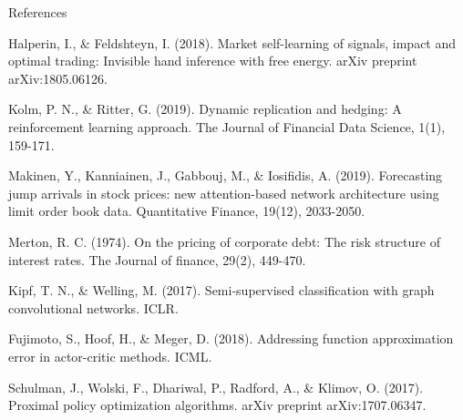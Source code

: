 \documentclass{beamer}
\begin{document}
\begin{frame}{References}
\footnotesize
\begin{thebibliography}{99}
 Halperin, I., \& Feldshteyn, I. (2018). Market self-learning of signals, impact and optimal trading: Invisible hand inference with free energy. arXiv preprint arXiv:1805.06126.

 Kolm, P. N., \& Ritter, G. (2019). Dynamic replication and hedging: A reinforcement learning approach. The Journal of Financial Data Science, 1(1), 159-171.

 Makinen, Y., Kanniainen, J., Gabbouj, M., \& Iosifidis, A. (2019). Forecasting jump arrivals in stock prices: new attention-based network architecture using limit order book data. Quantitative Finance, 19(12), 2033-2050.

 Merton, R. C. (1974). On the pricing of corporate debt: The risk structure of interest rates. The Journal of finance, 29(2), 449-470.

 Kipf, T. N., \& Welling, M. (2017). Semi-supervised classification with graph convolutional networks. ICLR.

 Fujimoto, S., Hoof, H., \& Meger, D. (2018). Addressing function approximation error in actor-critic methods. ICML.

 Schulman, J., Wolski, F., Dhariwal, P., Radford, A., \& Klimov, O. (2017). Proximal policy optimization algorithms. arXiv preprint arXiv:1707.06347.
\end{thebibliography}
\end{frame}
\end{document}
